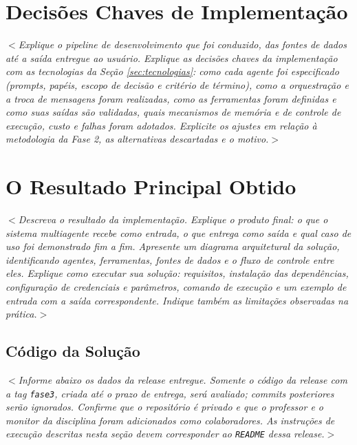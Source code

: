 \documentclass[12pt]{article}
\begin{document}
\section{Decisões Chaves de Implementação}
\label{sec:decisoes}

\textit{$<$Explique o pipeline de desenvolvimento que foi conduzido, das fontes de dados até a saída entregue ao usuário. Explique as decisões chaves da implementação com as tecnologias da Seção \ref{sec:tecnologias}: como cada agente foi especificado (\textit{prompts}, papéis, escopo de decisão e critério de término), como a orquestração e a troca de mensagens foram realizadas, como as ferramentas foram definidas e como suas saídas são validadas, quais mecanismos de memória e de controle de execução, custo e falhas foram adotados. Explicite os ajustes em relação à metodologia da Fase 2, as alternativas descartadas e o motivo.$>$}

\section{O Resultado Principal Obtido}
\label{sec:resultado}

\textit{$<$Descreva o resultado da implementação. Explique o produto final: o que o sistema multiagente recebe como entrada, o que entrega como saída e qual caso de uso foi demonstrado \textit{fim a fim}. Apresente um diagrama arquitetural da solução, identificando agentes, ferramentas, fontes de dados e o fluxo de controle entre eles. Explique como executar sua solução: requisitos, instalação das dependências, configuração de credenciais e parâmetros, comando de execução e um exemplo de entrada com a saída correspondente. Indique também as limitações observadas na prática.$>$}

\subsection*{Código da Solução}
\label{sec:codigo}

\textit{$<$Informe abaixo os dados da \textit{release} entregue. Somente o código da \textit{release} com a \textit{tag} \texttt{fase3}, criada até o prazo de entrega, será avaliado; \textit{commits} posteriores serão ignorados. Confirme que o repositório é privado e que o professor e o monitor da disciplina foram adicionados como colaboradores. As instruções de execução descritas nesta seção devem corresponder ao \texttt{README} dessa \textit{release}.$>$}
\end{document}
